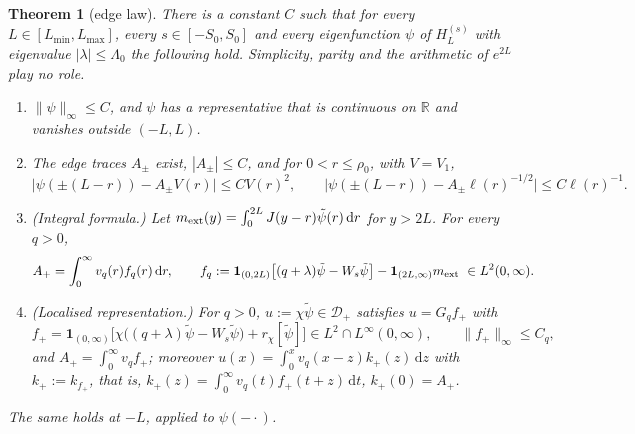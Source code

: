 \documentclass[11pt]{amsart}
\newcommand{\R}{\mathbb{R}}
\newcommand{\one}{\mathbf{1}}
\newcommand{\dd}{\,\mathrm{d}}
\newtheorem{theorem}{Theorem}[section]
\theoremstyle{definition}
\theoremstyle{remark}
\numberwithin{equation}{section}
\begin{document}
\begin{theorem}[edge law]\label{thm:E}
There is a constant $C$ such that for every $L\in[L_{\min},L_{\max}]$, every $s\in[-S_0,S_0]$ and every eigenfunction $\psi$ of $H^{(s)}_L$ with eigenvalue $|\lambda|\le\Lambda_0$ the following hold. Simplicity, parity and the arithmetic of $e^{2L}$ play no role.
\begin{enumerate}
\item[(i)] $\|\psi\|_\infty\le C$, and $\psi$ has a representative that is continuous on $\R$ and vanishes outside $(-L,L)$.
\item[(ii)] The edge traces $A_\pm$ exist, $|A_\pm|\le C$, and for $0<r\le\rho_0$, with $V=V_1$,
\[
\bigl|\psi(\pm(L-r))-A_\pm V(r)\bigr|\le CV(r)^2,\qquad\bigl|\psi(\pm(L-r))-A_\pm\ell(r)^{-1/2}\bigr|\le C\ell(r)^{-1}.
\]
\item[(iii)] \emph{(Integral formula.)} Let $m_{\rm ext}(y)=\int_0^{2L}J(y-r)\tilde\psi(r)\dd r$ for $y>2L$. For every $q>0$,
\[
A_+=\int_0^\infty v_q(r)f_q(r)\dd r,\qquad f_q:=\one_{(0,2L)}\bigl[(q+\lambda)\tilde\psi-W_s\tilde\psi\bigr]-\one_{(2L,\infty)}m_{\rm ext}\ \in L^2(0,\infty).
\]
\item[(iv)] \emph{(Localised representation.)} For $q>0$, $u:=\chi\tilde\psi\in \mathcal D_+$ satisfies $u=G_qf_+$ with
\[
f_+=\one_{(0,\infty)}\bigl[\chi\bigl((q+\lambda)\tilde\psi-W_s\tilde\psi\bigr)+r_\chi[\tilde\psi]\bigr]\in L^2\cap L^\infty(0,\infty),\qquad\|f_+\|_\infty\le C_q,
\]
and $A_+=\int_0^\infty v_qf_+$; moreover $u(x)=\int_0^xv_q(x-z)k_+(z)\dd z$ with $k_+:=k_{f_+}$, that is, $k_+(z)=\int_0^\infty v_q(t)f_+(t+z)\dd t$, $k_+(0)=A_+$.
\end{enumerate}
The same holds at $-L$, applied to $\psi(-\cdot)$.
\end{theorem}
\end{document}
